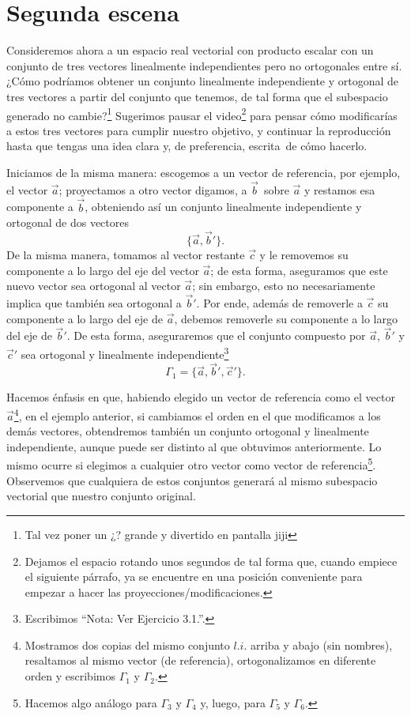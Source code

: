 \documentclass[12pt,dvipsnames]{article}
\numberwithin{equation}{section}
\begin{document}

\newpage
\section{Segunda escena}

Consideremos ahora a un espacio real vectorial con producto escalar con un conjunto de tres vectores linealmente independientes pero no ortogonales entre sí. ¿Cómo podríamos obtener un conjunto linealmente independiente y ortogonal de tres vectores a partir del conjunto que tenemos, de tal forma que el subespacio generado no cambie?\footnote{Tal vez poner un ¿? grande y divertido en pantalla jiji} Sugerimos pausar el video\footnote{Dejamos el espacio rotando unos segundos de tal forma que, cuando empiece el siguiente párrafo, ya se encuentre en una posición conveniente para empezar a hacer las proyecciones/modificaciones.} para pensar cómo modificarías a estos tres vectores para cumplir nuestro objetivo, y continuar la reproducción hasta que tengas una idea clara \textemdash y, de preferencia, escrita\textemdash \ de cómo hacerlo.

Iniciamos de la misma manera: escogemos a un vector de referencia, por ejemplo, el vector $\vec{a}$; proyectamos a otro vector \textemdash digamos, a $\vec{b}$\textemdash \ sobre $\vec{a}$ y restamos esa componente a $\vec{b}$, obteniendo así un conjunto linealmente independiente y ortogonal de dos vectores\[
\{\vec{a},\vec{b}'\}.
\] De la misma manera, tomamos al vector restante $\vec{c}$ y le removemos su componente a lo largo del eje del vector $\vec{a}$; de esta forma, aseguramos que este nuevo vector sea ortogonal al vector $\vec{a}$; sin embargo, esto no necesariamente implica que también sea ortogonal a $\vec{b}'$. Por ende, además de removerle a $\vec{c}$ su componente a lo largo del eje de $\vec{a}$, debemos removerle su componente a lo largo del eje de $\vec{b}'$. De esta forma, aseguraremos que el conjunto compuesto por $\vec{a}$, $\vec{b}'$ y $\vec{c}'$ sea ortogonal y linealmente independiente\footnote{Escribimos ``Nota: Ver Ejercicio 3.1.''.} \[
\Gamma_1 = \{\vec{a},\vec{b}',\vec{c}'\}.
\]

Hacemos énfasis en que, habiendo elegido un vector de referencia \textemdash como el vector $\vec{a}$\footnote{Mostramos dos copias del mismo conjunto $l.i.$ arriba y abajo (sin nombres), resaltamos al mismo vector (de referencia), ortogonalizamos en diferente orden y escribimos $\Gamma_1$ y $\Gamma_2$.}, en el ejemplo anterior\textemdash, si cambiamos el orden en el que modificamos a los demás vectores, obtendremos también un conjunto ortogonal y linealmente independiente, aunque puede ser distinto al que obtuvimos anteriormente. Lo mismo ocurre si elegimos a cualquier otro vector como vector de referencia\footnote{Hacemos algo análogo para $\Gamma_3$ y $\Gamma_4$ y, luego, para $\Gamma_5$ y $\Gamma_6$.}. Observemos que cualquiera de estos conjuntos generará al mismo subespacio vectorial que nuestro conjunto original.
\end{document}
